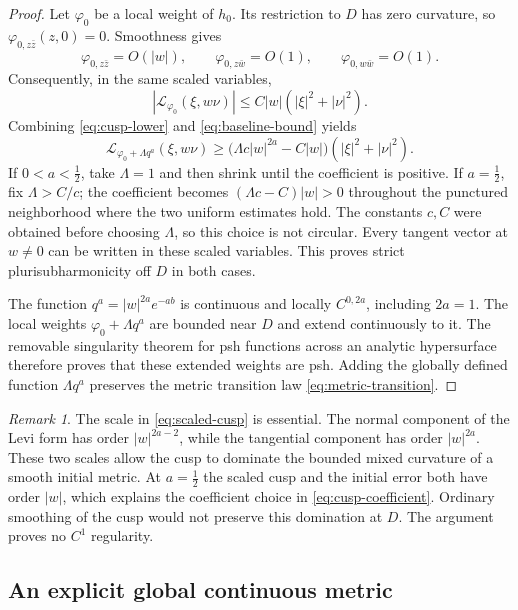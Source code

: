 \documentclass[11pt]{amsart}
\theoremstyle{definition}
\theoremstyle{remark}
\newtheorem{remark}[theorem]{Remark}
\numberwithin{equation}{section}
\newcommand{\Levi}{\mathcal L}
\begin{document}
\begin{proof}
Let $\varphi_0$ be a local weight of $h_0$. Its restriction to $D$ has
zero curvature, so $\varphi_{0,z\bar z}(z,0)=0$. Smoothness gives
\[
 \varphi_{0,z\bar z}=O(|w|),\qquad
 \varphi_{0,z\bar w}=O(1),\qquad
 \varphi_{0,w\bar w}=O(1).
\]
Consequently, in the same scaled variables,
\begin{equation}\label{eq:baseline-bound}
 |\Levi_{\varphi_0}(\xi,w\nu)|
 \le C|w|(|\xi|^2+|\nu|^2).
\end{equation}
Combining \eqref{eq:cusp-lower} and \eqref{eq:baseline-bound} yields
\begin{equation}\label{eq:cusp-coefficient}
 \Levi_{\varphi_0+\Lambda q^a}(\xi,w\nu)
 \ge\bigl(\Lambda c|w|^{2a}-C|w|\bigr)
       (|\xi|^2+|\nu|^2).
\end{equation}
If $0<a<\tfrac12$, take $\Lambda=1$ and then shrink until the
coefficient is positive. If $a=\tfrac12$, fix $\Lambda>C/c$; the
coefficient becomes $(\Lambda c-C)|w|>0$ throughout the punctured
neighborhood where the two uniform estimates hold. The constants
$c,C$ were obtained before choosing $\Lambda$, so this choice is not
circular. Every tangent vector at $w\ne0$ can be written in these
scaled variables. This proves strict plurisubharmonicity off $D$ in
both cases.

The function $q^a=|w|^{2a}e^{-ab}$ is continuous and locally
$C^{0,2a}$, including $2a=1$. The local weights
$\varphi_0+\Lambda q^a$ are bounded near $D$ and extend continuously
to it. The removable singularity theorem for psh functions across an
analytic hypersurface therefore proves that these extended weights
are psh. Adding the globally defined function $\Lambda q^a$ preserves
the metric transition law \eqref{eq:metric-transition}.
\end{proof}

\begin{remark}
The scale in \eqref{eq:scaled-cusp} is essential. The normal component
of the Levi form has order $|w|^{2a-2}$, while the tangential component
has order $|w|^{2a}$. These two scales allow the cusp to dominate the
bounded mixed curvature of a smooth initial metric. At $a=\tfrac12$
the scaled cusp and the initial error both have order $|w|$, which
explains the coefficient choice in \eqref{eq:cusp-coefficient}.
Ordinary smoothing of the cusp would not preserve this domination at
$D$. The argument proves no $C^1$ regularity.
\end{remark}

\subsection{An explicit global continuous metric}\label{sec:global}
\end{document}
